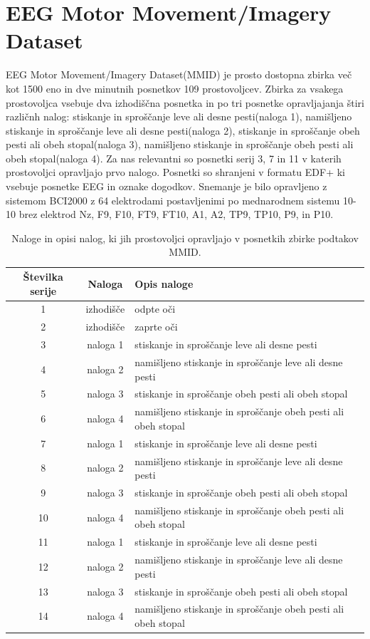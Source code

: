 \section{EEG Motor Movement/Imagery Dataset}
EEG Motor Movement/Imagery Dataset(MMID) je prosto dostopna zbirka več kot 1500 eno in dve minutnih posnetkov 109 prostovoljcev. Zbirka za vsakega prostovoljca vsebuje dva izhodiščna posnetka in po tri posnetke opravljajanja štiri različnh nalog: stiskanje in sproščanje leve ali desne pesti(naloga 1), namišljeno stiskanje in sproščanje leve ali desne pesti(naloga 2), stiskanje in sproščanje obeh pesti ali obeh stopal(naloga 3), namišljeno stiskanje in sproščanje obeh pesti ali obeh stopal(naloga 4). Za nas relevantni so posnetki serij 3, 7 in 11 v katerih prostovoljci opravljajo prvo nalogo. Posnetki so shranjeni v formatu EDF+ ki vsebuje posnetke EEG in oznake dogodkov. Snemanje je bilo opravljeno z sistemom BCI2000 z 64 elektrodami postavljenimi po mednarodnem sistemu 10-10 brez elektrod Nz, F9, F10, FT9, FT10, A1, A2, TP9, TP10, P9, in P10.\cite{sschalkBCI2000GeneralpurposeBraincomputer2004,schalkEEGMotorMovement2009}

\begin{table}[h]
\centering
\begin{tabular}{|c|c|l|}

\hline
Številka serije & Naloga &Opis naloge \\
\hline
1 & izhodišče & odpte oči  \\
\hline
2 & izhodišče & zaprte oči  \\
\hline
3 & naloga 1 & stiskanje in sproščanje leve ali desne pesti \\
\hline
4 & naloga 2 &namišljeno stiskanje in sproščanje leve ali desne pesti  \\
\hline
5 & naloga 3 &stiskanje in sproščanje obeh pesti ali obeh stopal \\
\hline
6 & naloga 4 &namišljeno stiskanje in sproščanje obeh pesti ali obeh stopal  \\
\hline
7 & naloga 1 &stiskanje in sproščanje leve ali desne pesti \\
\hline
8 & naloga 2 &namišljeno stiskanje in sproščanje leve ali desne pesti  \\
\hline
9 & naloga 3 &stiskanje in sproščanje obeh pesti ali obeh stopal \\
\hline
10 & naloga 4 &namišljeno stiskanje in sproščanje obeh pesti ali obeh stopal  \\
\hline
11 & naloga 1 &stiskanje in sproščanje leve ali desne pesti \\
\hline
12 &naloga 2 &namišljeno stiskanje in sproščanje leve ali desne pesti  \\
\hline
13 & naloga 3 &stiskanje in sproščanje obeh pesti ali obeh stopal \\
\hline
14 & naloga 4 &namišljeno stiskanje in sproščanje obeh pesti ali obeh stopal  \\

\hline
\end{tabular}
\caption{Naloge in opisi nalog, ki jih prostovoljci opravljajo v posnetkih zbirke podtakov MMID.}
\end{table}

